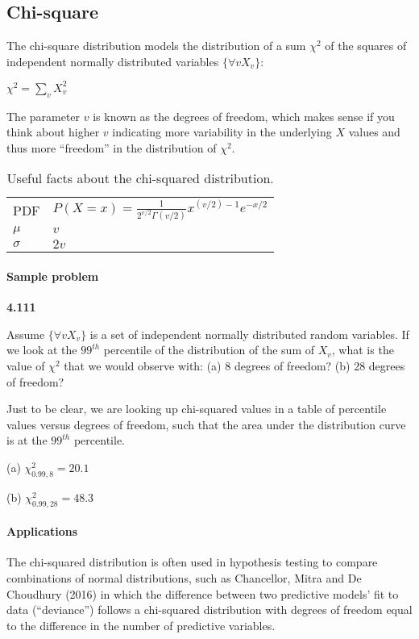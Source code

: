 \documentclass[11pt,letterpaper]{scrartcl}
\begin{document}
\subsection{Chi-square}

The chi-square distribution models the distribution of a sum $\chi^{2}$ of the squares of independent normally distributed variables $\{\forall{v} X_{v}\}$:

$\chi^{2} = \sum_{v}X^{2}_{v}$

The parameter $v$ is known as the degrees of freedom, which makes sense if you think about higher $v$ indicating more variability in the underlying $X$ values and thus more ``freedom'' in the distribution of $\chi^{2}$.

\begin{table}[h!]
\centering
\begin{tabular}{l l} \hline
PDF & $P(X=x) = \frac{1}{2^{v/2}\Gamma(v/2)}x^{(v/2)-1}e^{-x/2}$ \\
$\mu $ & $v$ \\
$\sigma $ & $2v$ \\ \hline
\end{tabular}
\caption{Useful facts about the chi-squared distribution.}
\label{tab:chi_squared}
\end{table}

\paragraph{Sample problem}

\textbf{4.111}

Assume $\{\forall{v} X_{v}\}$ is a set of independent normally distributed random variables. 
If we look at the $99^{th}$ percentile of the distribution of the sum of $X_{v}$, what is the value of $\chi^{2}$ that we would observe with: 
(a) 8 degrees of freedom?
(b) 28 degrees of freedom?

Just to be clear, we are looking up chi-squared values in a table of percentile values versus degrees of freedom, such that the area under the distribution curve is at the $99^{th}$ percentile.

(a) $\chi^{2}_{0.99, 8} = 20.1$

(b) $\chi^{2}_{0.99, 28} = 48.3$

\paragraph{Applications}

The chi-squared distribution is often used in hypothesis testing to compare combinations of normal distributions, such as Chancellor, Mitra and De Choudhury (2016) in which the difference between two predictive models' fit to data (``deviance'') follows a chi-squared distribution with degrees of freedom equal to the difference in the number of predictive variables. 
\end{document}
